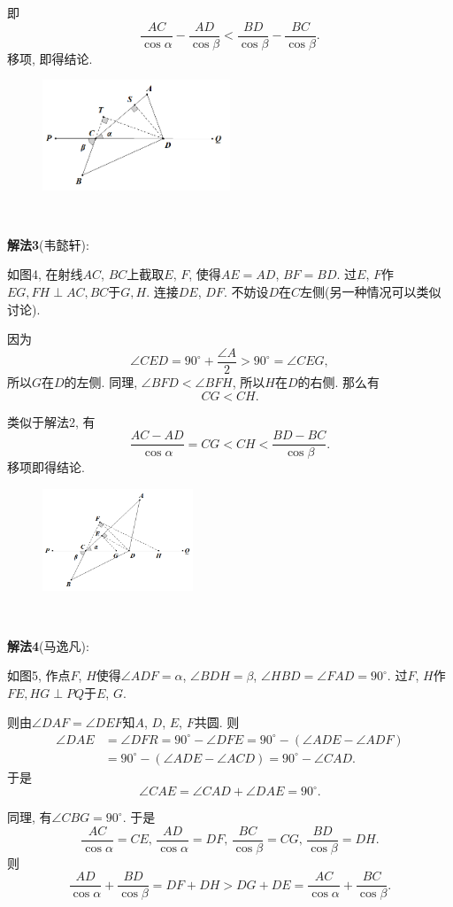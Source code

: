 \documentclass{article}
\begin{document}
即
\[\frac{AC}{\cos\alpha}-\frac{AD}{\cos\beta}<\frac{BD}{\cos\beta}-\frac{BC}{\cos\beta}.\]
移项, 即得结论.
\begin{figure}[htbp]
	\centering
	\includegraphics[width=0.5\textwidth]{3}
	\caption{}
\end{figure}\\\par
\textbf{解法3}({\fangsong 韦懿轩}):\par
如图4, 在射线$AC$, $BC$上截取$E$, $F$, 使得$AE=AD$, $BF=BD$. 过$E$, $F$作$EG, FH\perp AC, BC$于$G, H$. 连接$DE$, $DF$. 不妨设$D$在$C$左侧(另一种情况可以类似讨论).\par
因为
\[\angle CED=90^\circ+\frac{\angle A}{2}>90^\circ=\angle CEG,\]
所以$G$在$D$的左侧. 同理, $\angle BFD<\angle BFH$, 所以$H$在$D$的右侧. 那么有
\[CG<CH.\]\par
类似于解法2, 有
\[\frac{AC-AD}{\cos{\alpha}}=CG<CH<\frac{BD-BC}{\cos{\beta}}.\]
移项即得结论.
\begin{figure}[htbp]
	\centering
	\includegraphics[width=0.4\textwidth]{4.png}
	\caption{}
\end{figure}\\\par 
\textbf{解法4}({\fangsong 马逸凡}):\par
如图5, 作点$F$, $H$使得$\angle ADF=\alpha$, $\angle BDH=\beta$, $\angle HBD=\angle FAD=90^\circ$. 过$F$, $H$作$FE, HG\perp PQ$于$E$, $G$. \par
则由$\angle DAF=\angle DEF$知$A$, $D$, $E$, $F$共圆. 则
\begin{align*}
	\angle DAE&=\angle DFR=90^\circ-\angle DFE=90^\circ-(\angle ADE-\angle ADF)\\
	&=90^\circ-(\angle ADE-\angle ACD)=90^\circ-\angle CAD.
\end{align*}
于是
\[\angle CAE=\angle CAD+\angle DAE=90^\circ.\]\par
同理, 有$\angle CBG=90^\circ$. 于是
\[\frac{AC}{\cos\alpha}=CE,\,\frac{AD}{\cos\alpha}=DF,\,\frac{BC}{\cos\beta}=CG,\,\frac{BD}{\cos\beta}=DH.\]
则
\[\frac{AD}{\cos\alpha}+\frac{BD}{\cos\beta}=DF+DH>DG+DE
=\frac{AC}{\cos{\alpha}}+\frac{BC}{\cos{\beta}}.\]
\end{document}
